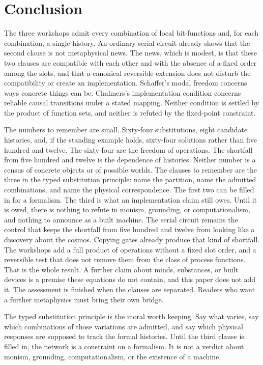 \documentclass[12pt]{article}
\begin{document}
\section{Conclusion}
\label{sec:end}

The three workshops admit every combination of local bit-functions and, for each combination, a single history. An ordinary serial circuit already shows that the second clause is not metaphysical news. The news, which is modest, is that these two clauses are compatible with each other and with the absence of a fixed order among the slots, and that a canonical reversible extension does not disturb the compatibility or create an implementation. Schaffer's modal freedom concerns ways concrete things can be. Chalmers's implementation condition concerns reliable causal transitions under a stated mapping. Neither condition is settled by the product of function sets, and neither is refuted by the fixed-point constraint.

The numbers to remember are small. Sixty-four substitutions, eight candidate histories, and, if the standing example holds, sixty-four solutions rather than five hundred and twelve. The sixty-four are the freedom of operations. The shortfall from five hundred and twelve is the dependence of histories. Neither number is a census of concrete objects or of possible worlds. The clauses to remember are the three in the typed substitution principle: name the partition, name the admitted combinations, and name the physical correspondence. The first two can be filled in for a formalism. The third is what an implementation claim still owes. Until it is owed, there is nothing to refute in monism, grounding, or computationalism, and nothing to announce as a built machine. The serial circuit remains the control that keeps the shortfall from five hundred and twelve from looking like a discovery about the cosmos. Copying gates already produce that kind of shortfall. The workshops add a full product of operations without a fixed slot order, and a reversible test that does not remove them from the class of process functions. That is the whole result. A further claim about minds, substances, or built devices is a premise these equations do not contain, and this paper does not add it. The assessment is finished when the clauses are separated. Readers who want a further metaphysics must bring their own bridge.

The typed substitution principle is the moral worth keeping. Say what varies, say which combinations of those variations are admitted, and say which physical responses are supposed to track the formal histories. Until the third clause is filled in, the network is a constraint on a formalism. It is not a verdict about monism, grounding, computationalism, or the existence of a machine.
\end{document}
